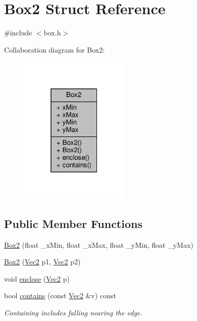 \hypertarget{structBox2}{}\section{Box2 Struct Reference}
\label{structBox2}


{\ttfamily \#include $<$box.\+h$>$}



Collaboration diagram for Box2\+:
\nopagebreak
\begin{figure}[H]
\begin{center}
\leavevmode
\includegraphics[width=148pt]{structBox2__coll__graph}
\end{center}
\end{figure}
\subsection*{Public Member Functions}
\begin{DoxyCompactItemize}
\item 
\hyperlink{structBox2_a6aa87f2d8b412ea27e6d21e6d14ea82e}{Box2} (float \+\_\+x\+Min, float \+\_\+x\+Max, float \+\_\+y\+Min, float \+\_\+y\+Max)
\item 
\hyperlink{structBox2_a5c4aa39e6462fdd31744eac9118b85a2}{Box2} (\hyperlink{vec_8h_a871640c4eb6057d21b25824c55250629}{Vec2} p1, \hyperlink{vec_8h_a871640c4eb6057d21b25824c55250629}{Vec2} p2)
\item 
void \hyperlink{structBox2_a7c79861eb4a94933f7facebfb53d44b2}{enclose} (\hyperlink{vec_8h_a871640c4eb6057d21b25824c55250629}{Vec2} p)
\item 
bool \hyperlink{structBox2_ad32f112b01ce71919b93b7bda4aec775}{contains} (const \hyperlink{vec_8h_a871640c4eb6057d21b25824c55250629}{Vec2} \&v) const 
\begin{DoxyCompactList}\small\item\em Containing includes falling nearing the edge. \end{DoxyCompactList}\end{DoxyCompactItemize}
